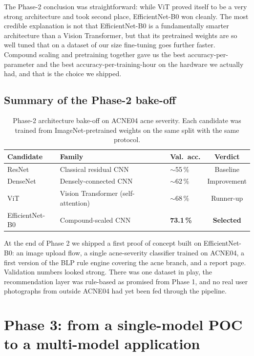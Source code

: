 \documentclass[11pt,a4paper,oneside]{report}
\newcommand{\effnet}{EfficientNet-B0\xspace}
\begin{document}
The Phase-2 conclusion was straightforward: while ViT proved
itself to be a very strong architecture and took second place,
\effnet won cleanly. The most credible explanation is not that
\effnet is a fundamentally smarter architecture than a Vision
Transformer, but that its pretrained weights are so well tuned
that on a dataset of our size fine-tuning goes further faster.
Compound scaling and pretraining together gave us the best
accuracy-per-parameter and the best accuracy-per-training-hour on
the hardware we actually had, and that is the choice we shipped.

\subsection{Summary of the Phase-2 bake-off}

\begin{table}[htbp]
    \centering
    \caption{Phase-2 architecture bake-off on ACNE04 acne severity.
    Each candidate was trained from ImageNet-pretrained weights on
    the same split with the same protocol.}
    \label{tab:phase2-arch}
    \small
    \begin{tabularx}{\linewidth}{lXlc}
        \toprule
        \textbf{Candidate} & \textbf{Family} & \textbf{Val.\ acc.} & \textbf{Verdict} \\
        \midrule
        ResNet    & Classical residual CNN            & $\sim$55\,\%   & Baseline \\
        DenseNet  & Densely-connected CNN             & $\sim$62\,\%   & Improvement \\
        ViT       & Vision Transformer (self-attention) & $\sim$68\,\% & Runner-up \\
        \effnet   & Compound-scaled CNN               & \textbf{73.1\,\%} & \textbf{Selected} \\
        \bottomrule
    \end{tabularx}
\end{table}

At the end of Phase 2 we shipped a first proof of concept built on
\effnet: an image upload flow, a single acne-severity classifier
trained on ACNE04, a first version of the BLP rule engine covering
the acne branch, and a report page. Validation numbers looked
strong. There was one dataset in play, the recommendation layer
was rule-based as promised from Phase 1, and no real user
photographs from outside ACNE04 had yet been fed through the
pipeline.

\section{Phase 3: from a single-model POC to a multi-model application}\label{sec:phase3-scale-up}
\end{document}
